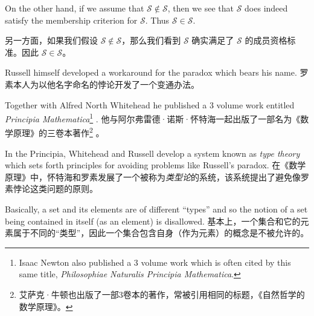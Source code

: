 On the other hand, if we assume that ${\mathcal S} \notin {\mathcal S}$,
then we see that ${\mathcal S}$ does indeed satisfy the membership criterion for ${\mathcal S}$.
Thus ${\mathcal S} \in {\mathcal S}$.

另一方面，如果我们假设 ${\mathcal S} \notin {\mathcal S}$，那么我们看到 ${\mathcal S}$ 确实满足了 ${\mathcal S}$ 的成员资格标准。因此 ${\mathcal S} \in {\mathcal S}$。

Russell himself developed a workaround for the paradox which
bears his name.
罗素本人为以他名字命名的悖论开发了一个变通办法。

Together with Alfred North Whitehead he published
a 3 volume work entitled \emph{Principia Mathematica}\footnote{Isaac Newton
also published a 3 volume work which is often cited by this same title,
\emph{Philosophiae Naturalis Principia Mathematica}.} \cite{PM}.
他与阿尔弗雷德·诺斯·怀特海一起出版了一部名为《数学原理》的三卷本著作\footnote{艾萨克·牛顿也出版了一部3卷本的著作，常被引用相同的标题，《自然哲学的数学原理》。} \cite{PM}。

In the Principia, Whitehead and Russell develop a system known as 
\emph{type theory} which sets forth principles for avoiding problems
like Russell's paradox.
在《数学原理》中，怀特海和罗素发展了一个被称为\emph{类型论}的系统，该系统提出了避免像罗素悖论这类问题的原则。

Basically, a set and its elements are of
different ``types'' and so the notion of a set being contained in itself
(as an element) is disallowed.
基本上，一个集合和它的元素属于不同的“类型”，因此一个集合包含自身（作为元素）的概念是不被允许的。
\clearpage 




%
%
%

